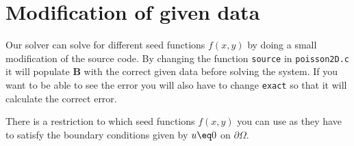 
\section{Modification of given data} %
\label{sec:modification_of_given_data}
Our solver can solve for different seed functions $f(x,y)$ by doing a small modification of the source code. By changing the function \texttt{source} in \texttt{poisson2D.c} it will populate \textbf{B} with the correct given data before solving the system. If you want to be able to see the error you will also have to change \texttt{exact} so that it will calculate the correct error. 

There is a restriction to which seed functions $f(x,y)$ you can use as they have to satisfy the boundary conditions given by $u \eq 0$ on $\partial\Omega$.	
